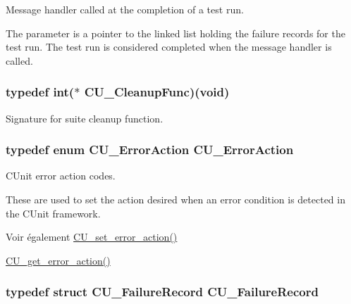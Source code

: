 Message handler called at the completion of a test run. 

The parameter is a pointer to the linked list holding the failure records for the test run. The test run is considered completed when the message handler is called. \hypertarget{group__Framework_ga90966c0bede742195897c3aeff4c342b}{
\subsubsection[{C\-U\-\_\-\-Cleanup\-Func}]{\setlength{\rightskip}{0pt plus 5cm}typedef int($\ast$ C\-U\-\_\-\-Cleanup\-Func)(void)}}\label{group__Framework_ga90966c0bede742195897c3aeff4c342b}


Signature for suite cleanup function. 

\hypertarget{group__Framework_gab68a2bd9fee7d73f79c0cfc68c576b3a}{
\subsubsection[{C\-U\-\_\-\-Error\-Action}]{\setlength{\rightskip}{0pt plus 5cm}typedef enum {\bf C\-U\-\_\-\-Error\-Action}  {\bf C\-U\-\_\-\-Error\-Action}}}\label{group__Framework_gab68a2bd9fee7d73f79c0cfc68c576b3a}


C\-Unit error action codes. 

These are used to set the action desired when an error condition is detected in the C\-Unit framework. \begin{DoxySeeAlso}{Voir également}
\hyperlink{group__Framework_ga58f4bdc1a05802f89005a487768b3d75}{C\-U\-\_\-set\-\_\-error\-\_\-action()} 

\hyperlink{group__Framework_gab2e98ce95448aa5a04a4875bc8152d6e}{C\-U\-\_\-get\-\_\-error\-\_\-action()} 
\end{DoxySeeAlso}
\hypertarget{group__Framework_ga5cada0980a95780d4d7c9f2f9b73d8ad}{
\subsubsection[{C\-U\-\_\-\-Failure\-Record}]{\setlength{\rightskip}{0pt plus 5cm}typedef struct {\bf C\-U\-\_\-\-Failure\-Record}  {\bf C\-U\-\_\-\-Failure\-Record}}}\label{group__Framework_ga5cada0980a95780d4d7c9f2f9b73d8ad}


